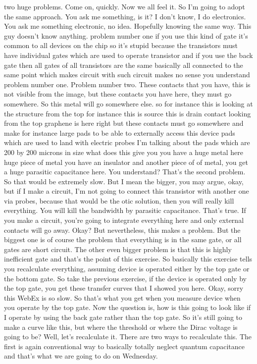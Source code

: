 two huge problems. Come on, quickly. Now we all feel it. So I'm going to adopt the same approach. You ask me something, is it? I don't know, I do electronics. You ask me something electronic, no idea. Hopefully knowing the same way. This guy doesn't know anything. problem number one if you use this kind of gate it's common to all devices on the chip so it's stupid because the transistors must have individual gates which are used to operate transistor and if you use the back gate then all gates of all transistors are the same basically all connected to the same point which makes circuit with such circuit makes no sense you understand problem number one. Problem number two. These contacts that you have, this is not visible from the image, but these contacts you have here, they must go somewhere. So this metal will go somewhere else. so for instance this is looking at the structure from the top for instance this is source this is drain contact looking from the top graphene is here right but these contacts must go somewhere and make for instance large pads to be able to externally access this device pads which are used to land with electric probes I'm talking about the pads which are 200 by 200 microns in size what does this give you you have a huge metal here huge piece of metal you have an insulator and another piece of of metal, you get a huge parasitic capacitance here. You understand? That's the second problem. So that would be extremely slow. But I mean the bigger, you may argue, okay, but if I make a circuit, I'm not going to connect this transistor with another one via probes, because that would be the otic solution, then you will really kill everything. You will kill the bandwidth by parasitic capacitance. That's true. If you make a circuit, you're going to integrate everything here and only external contacts will go away. Okay? But nevertheless, this makes a problem. But the biggest one is of course the problem that everything is in the same gate, or all gates are short circuit. The other even bigger problem is that this is highly inefficient gate and that's the point of this exercise. So basically this exercise tells you recalculate everything, assuming device is operated either by the top gate or the bottom gate. So take the previous exercise, if the device is operated only by the top gate, you get these transfer curves that I showed you here. Okay, sorry this WebEx is so slow. So that's what you get when you measure device when you operate by the top gate. Now the question is, how is this going to look like if I operate by using the back gate rather than the top gate. So it's still going to make a curve like this, but where the threshold or where the Dirac voltage is going to be? Well, let's recalculate it. There are two ways to recalculate this. The first is again conventional way to basically totally neglect quantum capacitance and that's what we are going to do on Wednesday.